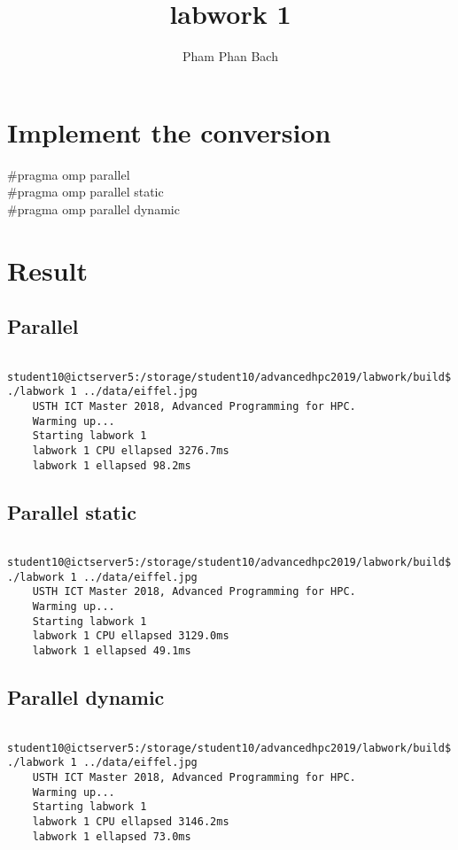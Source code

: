 \documentclass{article}
\title{labwork 1}
\author{Pham Phan Bach }
\begin{document}
\maketitle
    
\section{Implement the conversion}
    #pragma omp parallel \\
    #pragma omp parallel static \\
    #pragma omp parallel dynamic \\

\section{Result}

\subsection{Parallel}
\begin{verbatim}
    student10@ictserver5:/storage/student10/advancedhpc2019/labwork/build$ ./labwork 1 ../data/eiffel.jpg 
    USTH ICT Master 2018, Advanced Programming for HPC.
    Warming up...
    Starting labwork 1
    labwork 1 CPU ellapsed 3276.7ms
    labwork 1 ellapsed 98.2ms
\end{verbatim}{}

\subsection{Parallel static}
\begin{verbatim}
    student10@ictserver5:/storage/student10/advancedhpc2019/labwork/build$ ./labwork 1 ../data/eiffel.jpg 
    USTH ICT Master 2018, Advanced Programming for HPC.
    Warming up...
    Starting labwork 1
    labwork 1 CPU ellapsed 3129.0ms
    labwork 1 ellapsed 49.1ms
\end{verbatim}{}

\subsection{Parallel dynamic}
\begin{verbatim}
    student10@ictserver5:/storage/student10/advancedhpc2019/labwork/build$ ./labwork 1 ../data/eiffel.jpg 
    USTH ICT Master 2018, Advanced Programming for HPC.
    Warming up...
    Starting labwork 1
    labwork 1 CPU ellapsed 3146.2ms
    labwork 1 ellapsed 73.0ms

\end{verbatim}{}
\end{document}
